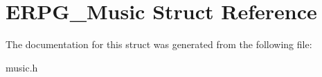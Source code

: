 \hypertarget{structERPG__Music}{\section{E\-R\-P\-G\-\_\-\-Music Struct Reference}
\label{structERPG__Music}
}


The documentation for this struct was generated from the following file\-:\begin{DoxyCompactItemize}
\item 
music.\-h\end{DoxyCompactItemize}
